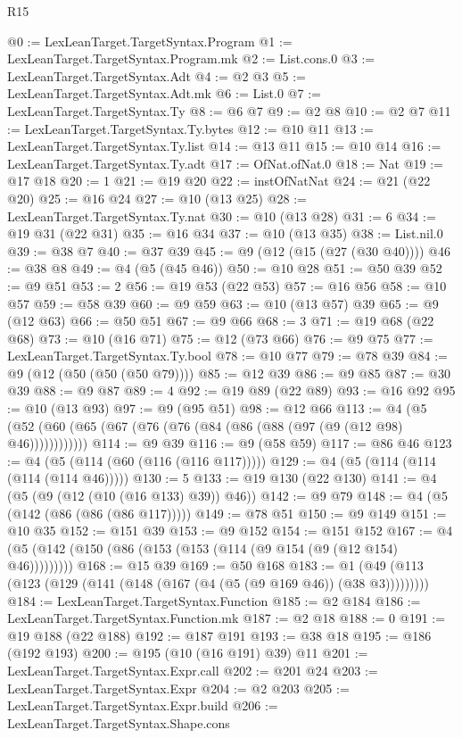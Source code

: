 \begin{lexlean}{R15}
\begin{coremodule}
@0 := LexLeanTarget.TargetSyntax.Program
@1 := LexLeanTarget.TargetSyntax.Program.mk
@2 := List.cons.{0}
@3 := LexLeanTarget.TargetSyntax.Adt
@4 := @2 @3
@5 := LexLeanTarget.TargetSyntax.Adt.mk
@6 := List.{0}
@7 := LexLeanTarget.TargetSyntax.Ty
@8 := @6 @7
@9 := @2 @8
@10 := @2 @7
@11 := LexLeanTarget.TargetSyntax.Ty.bytes
@12 := @10 @11
@13 := LexLeanTarget.TargetSyntax.Ty.list
@14 := @13 @11
@15 := @10 @14
@16 := LexLeanTarget.TargetSyntax.Ty.adt
@17 := OfNat.ofNat.{0}
@18 := Nat
@19 := @17 @18
@20 := 1
@21 := @19 @20
@22 := instOfNatNat
@24 := @21 (@22 @20)
@25 := @16 @24
@27 := @10 (@13 @25)
@28 := LexLeanTarget.TargetSyntax.Ty.nat
@30 := @10 (@13 @28)
@31 := 6
@34 := @19 @31 (@22 @31)
@35 := @16 @34
@37 := @10 (@13 @35)
@38 := List.nil.{0}
@39 := @38 @7
@40 := @37 @39
@45 := @9 (@12 (@15 (@27 (@30 @40))))
@46 := @38 @8
@49 := @4 (@5 (@45 @46))
@50 := @10 @28
@51 := @50 @39
@52 := @9 @51
@53 := 2
@56 := @19 @53 (@22 @53)
@57 := @16 @56
@58 := @10 @57
@59 := @58 @39
@60 := @9 @59
@63 := @10 (@13 @57) @39
@65 := @9 (@12 @63)
@66 := @50 @51
@67 := @9 @66
@68 := 3
@71 := @19 @68 (@22 @68)
@73 := @10 (@16 @71)
@75 := @12 (@73 @66)
@76 := @9 @75
@77 := LexLeanTarget.TargetSyntax.Ty.bool
@78 := @10 @77
@79 := @78 @39
@84 := @9 (@12 (@50 (@50 (@50 @79))))
@85 := @12 @39
@86 := @9 @85
@87 := @30 @39
@88 := @9 @87
@89 := 4
@92 := @19 @89 (@22 @89)
@93 := @16 @92
@95 := @10 (@13 @93)
@97 := @9 (@95 @51)
@98 := @12 @66
@113 := @4 (@5 (@52 (@60 (@65 (@67 (@76 (@76 (@84 (@86 (@88 (@97 (@9 (@12 @98) @46))))))))))))
@114 := @9 @39
@116 := @9 (@58 @59)
@117 := @86 @46
@123 := @4 (@5 (@114 (@60 (@116 (@116 @117)))))
@129 := @4 (@5 (@114 (@114 (@114 (@114 @46)))))
@130 := 5
@133 := @19 @130 (@22 @130)
@141 := @4 (@5 (@9 (@12 (@10 (@16 @133) @39)) @46))
@142 := @9 @79
@148 := @4 (@5 (@142 (@86 (@86 (@86 @117)))))
@149 := @78 @51
@150 := @9 @149
@151 := @10 @35
@152 := @151 @39
@153 := @9 @152
@154 := @151 @152
@167 := @4 (@5 (@142 (@150 (@86 (@153 (@153 (@114 (@9 @154 (@9 (@12 @154) @46)))))))))
@168 := @15 @39
@169 := @50 @168
@183 := @1 (@49 (@113 (@123 (@129 (@141 (@148 (@167 (@4 (@5 (@9 @169 @46)) (@38 @3)))))))))
@184 := LexLeanTarget.TargetSyntax.Function
@185 := @2 @184
@186 := LexLeanTarget.TargetSyntax.Function.mk
@187 := @2 @18
@188 := 0
@191 := @19 @188 (@22 @188)
@192 := @187 @191
@193 := @38 @18
@195 := @186 (@192 @193)
@200 := @195 (@10 (@16 @191) @39) @11
@201 := LexLeanTarget.TargetSyntax.Expr.call
@202 := @201 @24
@203 := LexLeanTarget.TargetSyntax.Expr
@204 := @2 @203
@205 := LexLeanTarget.TargetSyntax.Expr.build
@206 := LexLeanTarget.TargetSyntax.Shape.cons

\end{coremodule}
\end{lexlean}
